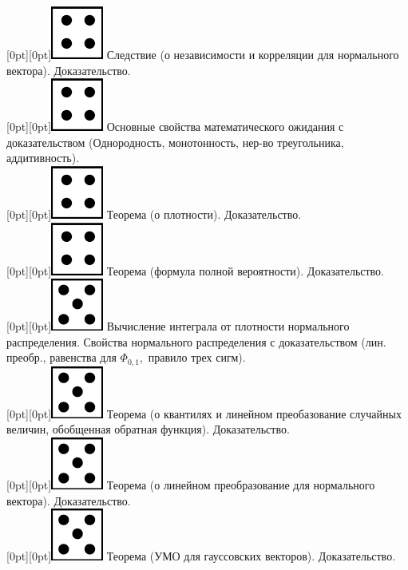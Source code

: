 \documentclass[10pt]{article}
\begin{document}
\raisebox{-1pt}[0pt][0pt]{\includegraphics[width=0.02\linewidth]{4.png}} Следствие (о независимости и корреляции для нормального вектора). Доказательство. \\ 

\raisebox{-1pt}[0pt][0pt]{\includegraphics[width=0.02\linewidth]{4.png}} Основные свойства математического ожидания с доказательством (Однородность, монотонность, нер-во треугольника, аддитивность). \\

\raisebox{-1pt}[0pt][0pt]{\includegraphics[width=0.02\linewidth]{4.png}} Теорема (о плотности). Доказательство. \\

\raisebox{-1pt}[0pt][0pt]{\includegraphics[width=0.02\linewidth]{4.png}} Теорема (формула полной вероятности). Доказательство. \\

\raisebox{-1pt}[0pt][0pt]{\includegraphics[width=0.02\linewidth]{5.png}} Вычисление интеграла от плотности нормального распределения.  Свойства нормального распределения с доказательством (лин. преобр., равенства для $\Phi_{0,1},$ правило трех сигм). \\

\raisebox{-1pt}[0pt][0pt]{\includegraphics[width=0.02\linewidth]{5.png}}   Теорема (о квантилях и линейном преобазование случайных величин, обобщенная обратная функция). Доказательство. \\

\raisebox{-1pt}[0pt][0pt]{\includegraphics[width=0.02\linewidth]{5.png}} Теорема (о линейном преобразование для нормального вектора). Доказательство. \\

\raisebox{-1pt}[0pt][0pt]{\includegraphics[width=0.02\linewidth]{5.png}} Теорема (УМО для гауссовских векторов). Доказательство. \\
\end{document}
